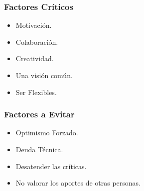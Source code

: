 \documentclass[12pt]{beamer}
\begin{document}
\begin{frame}
 \frametitle{Factores Críticos}
 \begin{itemize}
  \item<2-> Motivación.
  \item<3-> Colaboración.
  \item<4-> Creatividad.
  \item<5-> Una visión común.
  \item<6-> Ser Flexibles.
 \end{itemize}
\end{frame}


\begin{frame}
 \frametitle{Factores a Evitar}
 \begin{itemize}
  \item<2-> Optimismo Forzado.
  \item<3-> Deuda Técnica.
  \item<4-> Desatender las críticas.
  \item<5-> No valorar los aportes de otras personas.
 \end{itemize}
\end{frame}



\end{document}
